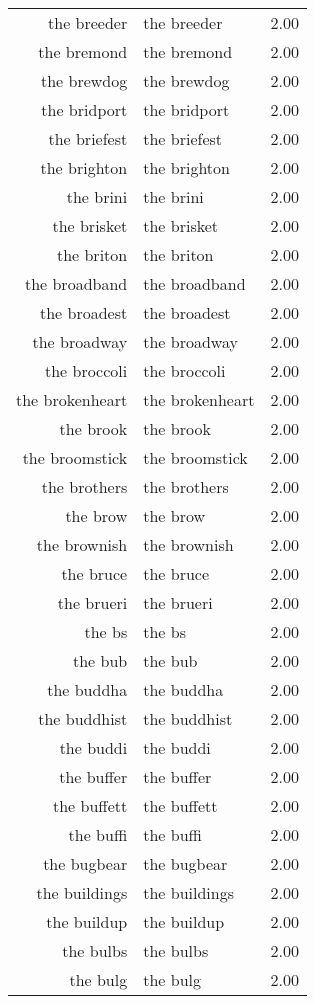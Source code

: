\begin{table}[ht]
\begin{tabular}{rlr}
  the breeder & the breeder & 2.00 \\ 
  the bremond & the bremond & 2.00 \\ 
  the brewdog & the brewdog & 2.00 \\ 
  the bridport & the bridport & 2.00 \\ 
  the briefest & the briefest & 2.00 \\ 
  the brighton & the brighton & 2.00 \\ 
  the brini & the brini & 2.00 \\ 
  the brisket & the brisket & 2.00 \\ 
  the briton & the briton & 2.00 \\ 
  the broadband & the broadband & 2.00 \\ 
  the broadest & the broadest & 2.00 \\ 
  the broadway & the broadway & 2.00 \\ 
  the broccoli & the broccoli & 2.00 \\ 
  the brokenheart & the brokenheart & 2.00 \\ 
  the brook & the brook & 2.00 \\ 
  the broomstick & the broomstick & 2.00 \\ 
  the brothers & the brothers & 2.00 \\ 
  the brow & the brow & 2.00 \\ 
  the brownish & the brownish & 2.00 \\ 
  the bruce & the bruce & 2.00 \\ 
  the brueri & the brueri & 2.00 \\ 
  the bs & the bs & 2.00 \\ 
  the bub & the bub & 2.00 \\ 
  the buddha & the buddha & 2.00 \\ 
  the buddhist & the buddhist & 2.00 \\ 
  the buddi & the buddi & 2.00 \\ 
  the buffer & the buffer & 2.00 \\ 
  the buffett & the buffett & 2.00 \\ 
  the buffi & the buffi & 2.00 \\ 
  the bugbear & the bugbear & 2.00 \\ 
  the buildings & the buildings & 2.00 \\ 
  the buildup & the buildup & 2.00 \\ 
  the bulbs & the bulbs & 2.00 \\ 
  the bulg & the bulg & 2.00 \\ 

\end{tabular}
\end{table}
